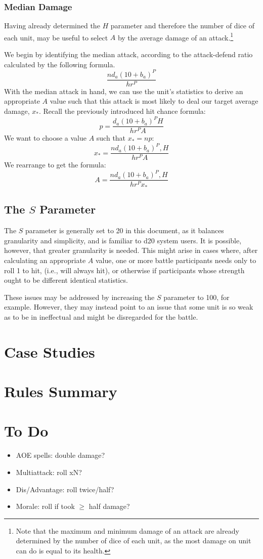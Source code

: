 \documentclass[twocolumn]{article}
\begin{document}
\subsubsection{Median Damage}

Having already determined the $H$ parameter and
therefore the number of dice of each unit,
may be useful to select $A$ by the average damage of an attack.\footnote{
    Note that the maximum and minimum damage of an attack
    are already determined by the number of dice of each unit,
    as the most damage on unit can do is equal to its health.
}

We begin by identifying the median attack,
according to the attack-defend ratio calculated by the following formula.
\[
    \frac
        {n d_a (10 + b_a)^P}
        {h r^P}
\]
With the median attack in hand,
we can use the unit's statistics to derive an appropriate $A$ value
such that this attack is most likely to deal our target average damage, $x_*$.
Recall the previously introduced hit chance formula:
\[
    p = \frac
        {d_a (10 + b_a)^P H}
        {h r^P A}
\]
We want to choose a value $A$ such that $x_* = n p$:
\[
    x_* = \frac
        {n d_a (10 + b_a)^P, H}
        {h r^P A}
\]
We rearrange to get the formula:
\[
    A = \frac
        {n d_a (10 + b_a)^P, H}
        {h r^P x_*}
\]

\subsection{The $S$ Parameter}
The $S$ parameter is generally set to 20 in this document,
as it balances granularity and simplicity,
and is familiar to d20 system users.
It is possible, however, that greater granularity is needed.
This might arise in cases where,
after calculating an appropriate $A$ value,
one or more battle participants needs only to roll 1 to hit,
(i.e., will always hit),
or otherwise if participants whose strength ought to be different
identical statistics.

These issues may be addressed by increasing the $S$ parameter to 100,
for example.
However, they may instead point to an issue that some unit
is so weak as to be in ineffectual and might be disregarded for the battle.

\section{Case Studies}

\section{Rules Summary}

\section{To Do}
\begin{itemize}
    \item AOE spells: double damage?
    \item Multiattack: roll xN?
    \item Dis/Advantage: roll twice/half?
    \item Morale: roll if took $\geq$ half damage?
\end{itemize}
\end{document}
